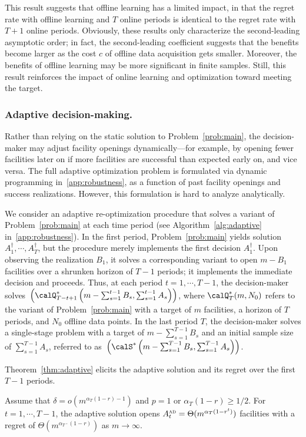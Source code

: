 \documentclass[blindrev]{informs3noheader}
\begin{document}
This result suggests that offline learning has a limited impact, in that the regret rate with offline learning and $T$ online periods is identical to the regret rate with $T+1$ online periods. Obviously, these results only characterize the second-leading asymptotic order; in fact, the second-leading coefficient suggests that the benefits become larger as the cost $c$ of offline data acquisition gets smaller. Moreover, the benefits of offline learning may be more significant in finite samples. Still, this result reinforces the impact of online learning and optimization toward meeting the target.

\subsubsection*{Adaptive decision-making.}

Rather than relying on the static solution to Problem~\eqref{prob:main}, the decision-maker may adjust facility openings dynamically---for example, by opening fewer facilities later on if more facilities are successful than expected early on, and vice versa. The full adaptive optimization problem is formulated via dynamic programming in~\ref{app:robustness}, as a function of past facility openings and success realizations. However, this formulation is hard to analyze analytically.

We consider an adaptive re-optimization procedure that solves a variant of Problem~\eqref{prob:main} at each time period (see Algorithm~\ref{alg:adaptive} in~\ref{app:robustness}). In the first period, Problem~\eqref{prob:main} yields solution $A^\dagger_1,\cdots,A^\dagger_T$, but the procedure merely implements the first decision $A^\dagger_1$. Upon observing the realization $B_1$, it solves a corresponding variant to open $m-B_1$ facilities over a shrunken horizon of $T-1$ periods; it implements the immediate decision and proceeds. Thus, at each period $t=1,\cdots,T-1$, the decision-maker solves~$\left(\calQ^*_{T-t+1}\left(m-\sum_{s=1}^{t-1}B_s,\sum_{s=1}^{t-1} A_s\right)\right)$, where $\calQ^*_T(m,N_0)$ refers to the variant of Problem~\eqref{prob:main} with a target of $m$ facilities, a horizon of $T$ periods, and $N_0$ offline data points. In the last period $T$, the decision-maker solves a single-stage problem with a target of $m-\sum_{s=1}^{T-1}B_s$ and an initial sample size of $\sum_{s=1}^{T-1}A_s$, referred to as~$\left(\calS^*\left(m-\sum_{s=1}^{T-1}B_s,\sum_{s=1}^{T-1} A_s\right)\right)$.

Theorem~\ref{thm:adaptive} elicits the adaptive solution and its regret over the first $T-1$ periods.
\begin{theorem}\label{thm:adaptive}
Assume that $\delta = o(m^{\alpha_T(1-r)-1})$ and $p=1$ or $\alpha_T(1-r)\geq1/2$. For $t=1,\cdots,T-1$, the adaptive solution opens $A^{\textsc{ad}}_t=\Theta(m^{\alpha_T(1-r^t)})$ facilities with a regret of $\Theta\left(m^{\alpha_T\cdot(1-r)}\right)$ as $m \to \infty$.
\end{theorem}
\end{document}
